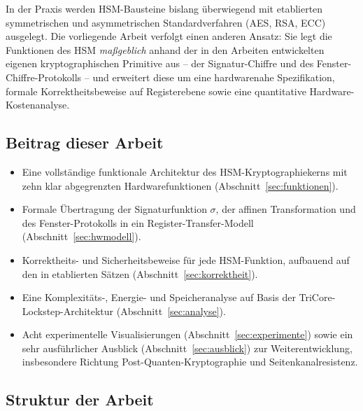 ﻿\documentclass[a4paper,12pt]{article}
\theoremstyle{definition}
\begin{document}
In der Praxis werden HSM-Bausteine bislang überwiegend mit etablierten symmetrischen und asymmetrischen Standardverfahren (AES, RSA, ECC) ausgelegt. Die vorliegende Arbeit verfolgt einen anderen Ansatz: Sie legt die Funktionen des HSM \emph{maßgeblich} anhand der in den Arbeiten \cite{Epp26b,Epp26c} entwickelten eigenen kryptographischen Primitive aus -- der Signatur-Chiffre und des Fenster-Chiffre-Protokolls -- und erweitert diese um eine hardwarenahe Spezifikation, formale Korrektheitsbeweise auf Registerebene sowie eine quantitative Hardware-Kostenanalyse.

\subsection{Beitrag dieser Arbeit}

\begin{itemize}
	\item Eine vollständige funktionale Architektur des HSM-Kryptographiekerns mit zehn klar abgegrenzten Hardwarefunktionen (Abschnitt~\ref{sec:funktionen}).
	\item Formale Übertragung der Signaturfunktion $\sigma$, der affinen Transformation und des Fenster-Protokolls in ein Register-Transfer-Modell (Abschnitt~\ref{sec:hwmodell}).
	\item Korrektheits- und Sicherheitsbeweise für jede HSM-Funktion, aufbauend auf den in \cite{Epp26b,Epp26c,Epp26a} etablierten Sätzen (Abschnitt~\ref{sec:korrektheit}).
	\item Eine Komplexitäts-, Energie- und Speicheranalyse auf Basis der TriCore-Lockstep-Architektur (Abschnitt~\ref{sec:analyse}).
	\item Acht experimentelle Visualisierungen (Abschnitt~\ref{sec:experimente}) sowie ein sehr ausführlicher Ausblick (Abschnitt~\ref{sec:ausblick}) zur Weiterentwicklung, insbesondere Richtung Post-Quanten-Kryptographie und Seitenkanalresistenz.
\end{itemize}

\subsection{Struktur der Arbeit}
\end{document}
